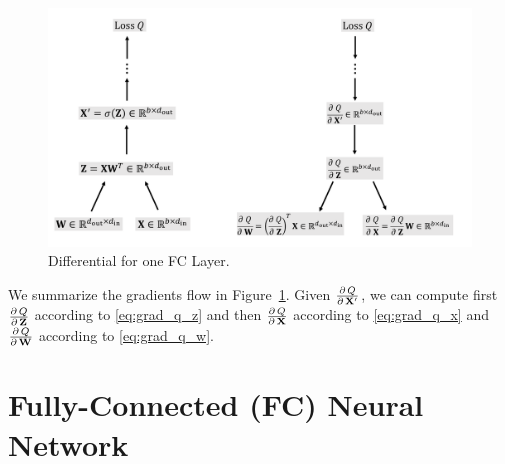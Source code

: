 \documentclass[11pt]{article}
\numberwithin{equation}{section}
\def\W{{\bf W}}
\def\X{{\bf X}}
\def\Z{{\bf Z}}
\begin{document}
\begin{figure}[!h]
	\centering
	\includegraphics[width=0.85\linewidth]{figures/differential.pdf}
	\caption{Differential for one FC Layer.}
	\label{fig:differential}
\end{figure}




We summarize the gradients flow in Figure~\ref{fig:differential}.
Given $ \frac{\partial \, Q }{ \partial \, \X' }$, we can compute first $ \frac{\partial \, Q }{ \partial \, \Z }$ according to \eqref{eq:grad_q_z} and then $ \frac{\partial \, Q }{ \partial \, \X }$ according to \eqref{eq:grad_q_x} and $ \frac{\partial \, Q }{ \partial \, \W }$ according to \eqref{eq:grad_q_w}.



\section{Fully-Connected (FC) Neural Network}
\end{document}
